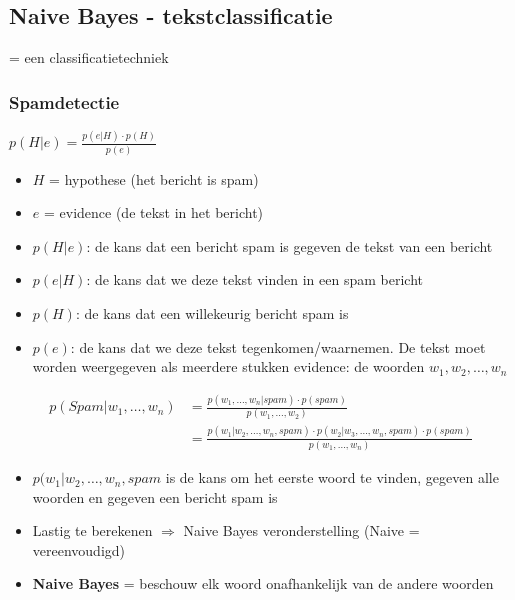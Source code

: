 \documentclass{article}
\begin{document}
\subsection{Naive Bayes - tekstclassificatie}

= een classificatietechniek

\subsubsection{Spamdetectie}

\begin{center}
    $p(H|e) = \frac{p(e|H) \cdot p(H)}{p(e)}$
\end{center}

\begin{itemize}
    \item $H$ = hypothese (het bericht is spam)
    \item $e$ = evidence (de tekst in het bericht)
    \item $p(H|e)$: de kans dat een bericht spam is gegeven de tekst van een bericht
    \item $p(e|H)$: de kans dat we deze tekst vinden in een spam bericht
    \item $p(H)$: de kans dat een willekeurig bericht spam is
    \item $p(e)$: de kans dat we deze tekst tegenkomen/waarnemen. De tekst moet worden weergegeven als meerdere stukken evidence: de woorden $w_1, w_2, \dots, w_n$
\end{itemize}


\begin{align*}
    p(Spam | w_1, \dots, w_n) & = \frac{p(w_1, \dots, w_n | spam) \cdot p(spam)}{p(w_1, \dots, w_2)}\\
    & = \frac{p(w_1 | w_2, \dots, w_n, spam) \cdot p(w_2 | w_3, \dots, w_n, spam) \cdot p(spam)}{p(w_1, \dots, w_n)}
\end{align*}

\begin{itemize}
    \item $p(w_1 | w_2, \dots, w_n, spam$ is de kans om het eerste woord te vinden, gegeven alle woorden en gegeven een bericht spam is
    \item Lastig te berekenen $\Rightarrow$ Naive Bayes veronderstelling (Naive = vereenvoudigd)
    \item \textbf{Naive Bayes} = beschouw elk woord onafhankelijk van de andere woorden
\end{itemize}
\end{document}
